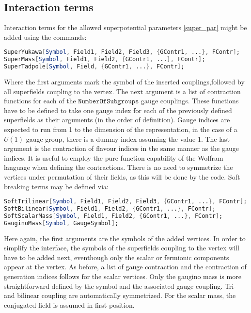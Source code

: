 \documentclass{scrartcl}
\begin{document}
\subsection{Interaction terms}
Interaction terms for the allowed superpotential parameters \ref{super_par} might be added using the commands:
\begin{lstlisting}[language=mathematica,mathescape,columns=flexible,backgroundcolor=\color{light-gray}]
SuperYukawa[Symbol, Field1, Field2, Field3, {GContr1, ...}, FContr];
SuperMass[Symbol, Field1, Field2, {GContr1, ...}, FContr];
SuperTadpole[Symbol, Field, {GContr1, ...}, FContr];
\end{lstlisting}
Where the first arguments mark the symbol of the inserted couplings,followed by all superfields coupling to the vertex. The next argument is a list of contraction functions for each of the $\mathtt{NumberOfSubgroups}$ gauge couplings. These functions have to be defined to take one gauge index for each of the previously defined superfields as their arguments (in the order of definition). Gauge indices are expected to run from 1 to the dimension of the representation, in the case of a $U(1)$ gauge group, there is a dummy index assuming the value 1. The last argument is the contraction of flavour indices in the same manner as the gauge indices. It is useful to employ the pure function capability of the Wolfram language when defining the contractions. There is no need to symmetrize the vertices under permutation of their fields, as this will be done by the code.
\newline
Soft breaking terms may be defined via:
\begin{lstlisting}[language=mathematica,mathescape,columns=flexible,backgroundcolor=\color{light-gray}]
SoftTrilinear[Symbol, Field1, Field2, Field3, {GContr1, ...}, FContr];
SoftBilinear[Symbol, Field1, Field2, {GContr1, ...}, FContr];
SoftScalarMass[Symbol, Field1, Field2, {GContr1, ...}, FContr];
GauginoMass[Symbol, GaugeSymbol];
\end{lstlisting}
Here again, the first arguments are the symbols of the added vertices. In order to simplify the interface, the symbols of the superfields coupling to the vertex will have to be added next, eventhough only the scalar or fermionic components appear at the vertex. As before, a list of gauge contraction and the contraction of generation indices follows for the scalar vertices. Only the gaugino mass is more straightforward defined by the symbol and the associated gauge coupling. Tri- and bilinear coupling are automatically symmetrized. For the scalar mass, the conjugated field is assumed in first position. 
\end{document}
